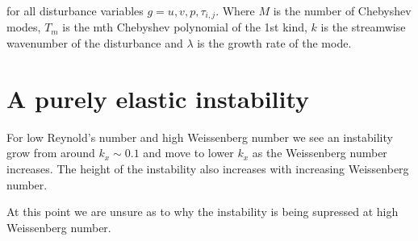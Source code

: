 \documentclass{jfm}
\begin{document}
for all disturbance variables $g = u, v, p, \tau_{i,j}$. Where $M$ is the number of Chebyshev modes, $T_{m}$ is the mth Chebyshev polynomial of the 1st kind, $k$ is the streamwise wavenumber of the disturbance and $\lambda$ is the growth rate of the mode. 

\section{A purely elastic instability}

For low Reynold's number and high Weissenberg number we see an instability grow from around $k_x \sim 0.1$ and move to lower $k_x$ as the Weissenberg number increases. The height of the instability also increases with increasing Weissenberg number. 

At this point we are unsure as to why the instability is being supressed at high Weissenberg number.
\end{document}
